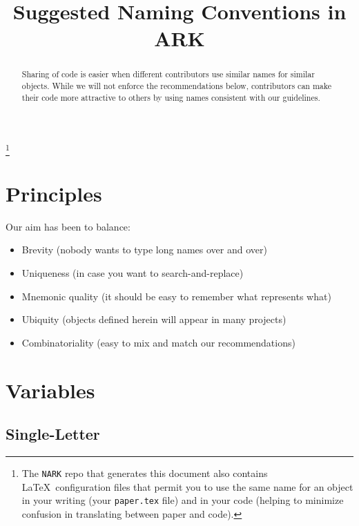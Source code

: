 \documentclass[12pt]{econtex}
\begin{document}
\title{Suggested Naming Conventions in ARK}


\vspace{2in}



\maketitle 


\begin{abstract}
  Sharing of code is easier when different contributors use similar names for similar objects.  While we will not enforce the
  recommendations below, contributors can make their code more attractive to others 
  by using names consistent with our guidelines.  
\end{abstract}

\thanks{The \texttt{NARK} repo that generates this document 
also contains \LaTeX~configuration files that permit you to use the same name for an object in 
your writing (your \texttt{paper.tex} file) and in your code (helping to minimize confusion in translating between paper and code).}


\pagebreak

\section{Principles}
Our aim has been to balance:
\begin{itemize}
\item Brevity (nobody wants to type long names over and over)
\item Uniqueness (in case you want to search-and-replace)
\item Mnemonic quality (it should be easy to remember what represents what)
\item Ubiquity (objects defined herein will appear in many projects)
\item Combinatoriality (easy to mix and match our recommendations)
\end{itemize}


\pagebreak

\section{Variables}

\subsection{Single-Letter}
\end{document}

